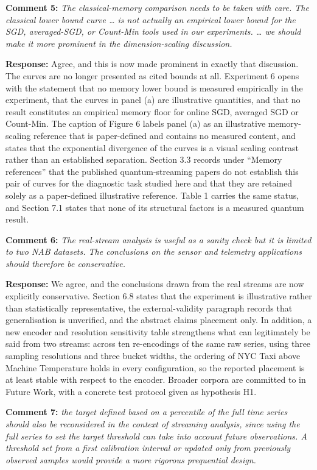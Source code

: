 \documentclass[
  11pt,
]{article}
\begin{document}
\textbf{Comment 5:} \emph{The classical-memory comparison needs to be
taken with care. The classical lower bound curve \ldots{} is not
actually an empirical lower bound for the SGD, averaged-SGD, or
Count-Min tools used in our experiments. \ldots{} we should make it more
prominent in the dimension-scaling discussion.}

\textbf{Response:} Agree, and this is now made prominent in exactly that
discussion. The curves are no longer presented as cited bounds at all.
Experiment 6 opens with the statement that no memory lower bound is
measured empirically in the experiment, that the curves in panel (a) are
illustrative quantities, and that no result constitutes an empirical
memory floor for online SGD, averaged SGD or Count-Min. The caption of
Figure 6 labels panel (a) as an illustrative memory-scaling reference
that is paper-defined and contains no measured content, and states that
the exponential divergence of the curves is a visual scaling contrast
rather than an established separation. Section 3.3 records under
``Memory references'' that the published quantum-streaming papers do not
establish this pair of curves for the diagnostic task studied here and
that they are retained solely as a paper-defined illustrative reference.
Table 1 carries the same status, and Section 7.1 states that none of its
structural factors is a measured quantum result.

\textbf{Comment 6:} \emph{The real-stream analysis is useful as a sanity
check but it is limited to two NAB datasets. The conclusions on the
sensor and telemetry applications should therefore be conservative.}

\textbf{Response:} We agree, and the conclusions drawn from the real
streams are now explicitly conservative. Section 6.8 states that the
experiment is illustrative rather than statistically representative, the
external-validity paragraph records that generalisation is unverified,
and the abstract claims placement only. In addition, a new encoder and
resolution sensitivity table strengthens what can legitimately be said
from two streams: across ten re-encodings of the same raw series, using
three sampling resolutions and three bucket widths, the ordering of NYC
Taxi above Machine Temperature holds in every configuration, so the
reported placement is at least stable with respect to the encoder.
Broader corpora are committed to in Future Work, with a concrete test
protocol given as hypothesis H1.

\textbf{Comment 7:} \emph{the target defined based on a percentile of
the full time series should also be reconsidered in the context of
streaming analysis, since using the full series to set the target
threshold can take into account future observations. A threshold set
from a first calibration interval or updated only from previously
observed samples would provide a more rigorous prequential design.}
\end{document}
